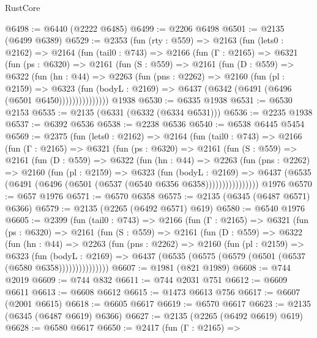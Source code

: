 \begin{lexlean}{RustCore}
\begin{coremodule}
@6498 := @6440 (@2222 @6485)
@6499 := @2206 @6498
@6501 := @2135 (@6499 @6389)
@6529 := @2353
    (fun (rty : @559) =>
    @2163
      (fun (lets0 : @2162) =>
      @2164
        (fun (tail0 : @743) =>
        @2166
          (fun (Γ : @2165) =>
          @6321
            (fun (ps : @6320) =>
            @2161
              (fun (S : @559) =>
              @2161
                (fun (D : @559) =>
                @6322
                  (fun (hn : @44) =>
                  @2263
                    (fun (pns : @2262) =>
                    @2160
                      (fun (pl : @2159) =>
                      @6323
                        (fun (bodyL : @2169) =>
                        @6437 (@6342 (@6491 (@6496 (@6501 @6450)))))))))))))))
    @1938
@6530 := @6335 @1938
@6531 := @6530 @2153
@6535 := @2135 (@6331 (@6332 (@6334 @6531)))
@6536 := @2235 @1938
@6537 := @6392 @6536
@6538 := @2238 @6536
@6540 := @6538 @6445 @5454
@6569 := @2375
    (fun (lets0 : @2162) =>
    @2164
      (fun (tail0 : @743) =>
      @2166
        (fun (Γ : @2165) =>
        @6321
          (fun (ps : @6320) =>
          @2161
            (fun (S : @559) =>
            @2161
              (fun (D : @559) =>
              @6322
                (fun (hn : @44) =>
                @2263
                  (fun (pns : @2262) =>
                  @2160
                    (fun (pl : @2159) =>
                    @6323
                      (fun (bodyL : @2169) =>
                      @6437 (@6535 (@6491 (@6496 (@6501 (@6537 (@6540 @6356 @6358))))))))))))))))
    @1976
@6570 := @657 @1976
@6571 := @6570 @6358
@6575 := @2135 (@6345 (@6487 @6571) @6366)
@6579 := @2135 (@2265 (@6492 @6571) @619)
@6580 := @6540 @1976
@6605 := @2399
    (fun (tail0 : @743) =>
    @2166
      (fun (Γ : @2165) =>
      @6321
        (fun (ps : @6320) =>
        @2161
          (fun (S : @559) =>
          @2161
            (fun (D : @559) =>
            @6322
              (fun (hn : @44) =>
              @2263
                (fun (pns : @2262) =>
                @2160
                  (fun (pl : @2159) =>
                  @6323
                    (fun (bodyL : @2169) =>
                    @6437 (@6535 (@6575 (@6579 (@6501 (@6537 (@6580 @6358)))))))))))))))
@6607 := @1981 (@821 @1989)
@6608 := @744 @2019
@6609 := @744 @832
@6611 := @744 @2031 @751
@6612 := @6609 @6611
@6613 := @6608 @6612
@6615 := @1473 @6613 @756
@6617 := @6607 (@2001 @6615)
@6618 := @6605 @6617
@6619 := @6570 @6617
@6623 := @2135 (@6345 (@6487 @6619) @6366)
@6627 := @2135 (@2265 (@6492 @6619) @619)
@6628 := @6580 @6617
@6650 := @2417
    (fun (Γ : @2165) =>

\end{coremodule}
\end{lexlean}

